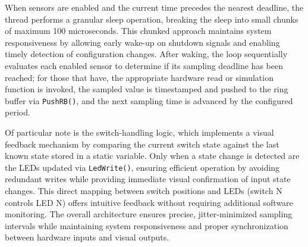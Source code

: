 When sensors are enabled and the current time precedes the nearest deadline, the thread performs a granular sleep operation, breaking the sleep into small chunks of maximum 100 microseconds. This chunked approach maintains system responsiveness by allowing early wake-up on shutdown signals and enabling timely detection of configuration changes. After waking, the loop sequentially evaluates each enabled sensor to determine if its sampling deadline has been reached; for those that have, the appropriate hardware read or simulation function is invoked, the sampled value is timestamped and pushed to the ring buffer via \texttt{PushRB()}, and the next sampling time is advanced by the configured period. 

Of particular note is the switch-handling logic, which implements a visual feedback mechanism by comparing the current switch state against the last known state stored in a static variable. Only when a state change is detected are the LEDs updated via \texttt{LedWrite()}, ensuring efficient operation by avoiding redundant writes while providing immediate visual confirmation of input state changes. This direct mapping between switch positions and LEDs (switch N controls LED N) offers intuitive feedback without requiring additional software monitoring. The overall architecture ensures precise, jitter-minimized sampling intervals while maintaining system responsiveness and proper synchronization between hardware inputs and visual outputs.
